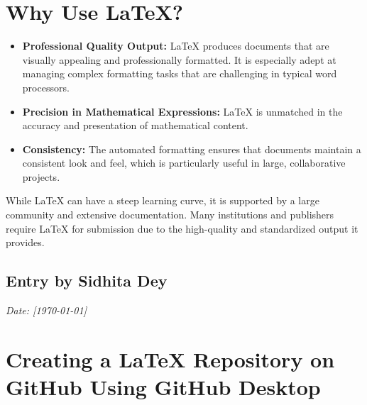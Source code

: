\documentclass[12pt, a4paper]{article}
\begin{document}
\section*{\textcolor{blue!60}{\Huge Why Use LaTeX?}}
\vspace{0.8cm}
\begin{itemize}
    \item \textbf{Professional Quality Output:} \textmd{LaTeX produces documents that are visually appealing and professionally formatted. It is especially adept at managing complex formatting tasks that are challenging in typical word processors.}
\vspace{0.5cm}
    \item \textbf{Precision in Mathematical Expressions:} \textmd{LaTeX is unmatched in the accuracy and presentation of mathematical content.}
    \vspace{0.5cm}
    \item \textbf{Consistency:} \textmd{The automated formatting ensures that documents maintain a consistent look and feel, which is particularly useful in large, collaborative projects.}
\end{itemize}
\vspace{0.6cm}

While LaTeX can have a steep learning curve, it is supported by a large community and extensive documentation. Many institutions and publishers require LaTeX for submission due to the high-quality and standardized output it provides.

\newpage
{}
\vspace{-2cm}
\subsection*{Entry by Sidhita Dey}
\textit{Date: [\today]}\\
\centering
\section*{\textcolor{blue!60}{\Huge Creating a LaTeX Repository on GitHub Using GitHub Desktop}}

\vspace{0.8cm}
\end{document}
